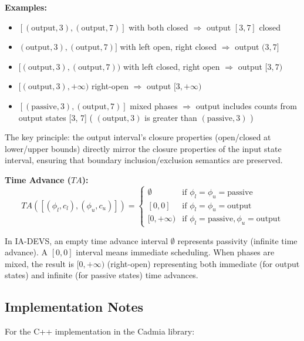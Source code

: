 \textbf{Examples:}
\begin{itemize}
    \item $[(\text{output}, 3), (\text{output}, 7)]$ with both closed $\Rightarrow$ output $[3, 7]$ closed
    \item $(\text{output}, 3), (\text{output}, 7)]$ with left open, right closed $\Rightarrow$ output $(3, 7]$
    \item $[(\text{output}, 3), (\text{output}, 7))$ with left closed, right open $\Rightarrow$ output $[3, 7)$
    \item $[(\text{output}, 3), +\infty)$ right-open $\Rightarrow$ output $[3, +\infty)$
    \item $[(\text{passive}, 3), (\text{output}, 7)]$ mixed phases $\Rightarrow$ output includes counts from output states [3, 7] ( $(\text{output}, 3)$ is greater than $(\text{passive}, 3)$ )
\end{itemize}

The key principle: the output interval's closure properties (open/closed at lower/upper bounds) directly mirror the closure properties of the input state interval, ensuring that boundary inclusion/exclusion semantics are preserved.

\bigskip

\textbf{Time Advance ($TA$):}
\[
TA([(\phi_l, c_l), (\phi_u, c_u)]) = 
\begin{cases}
    \emptyset & \text{if } \phi_l = \phi_u = \text{passive} \\
    [0, 0] & \text{if } \phi_l = \phi_u = \text{output} \\
    [0, +\infty) & \text{if } \phi_l = \text{passive}, \phi_u = \text{output}
\end{cases}
\]

In IA-DEVS, an empty time advance interval $\emptyset$ represents passivity (infinite time advance). A $[0, 0]$ interval means immediate scheduling. When phases are mixed, the result is $[0, +\infty)$ (right-open) representing both immediate (for output states) and infinite (for passive states) time advances.

\subsection{Implementation Notes}

For the C++ implementation in the Cadmia library:

